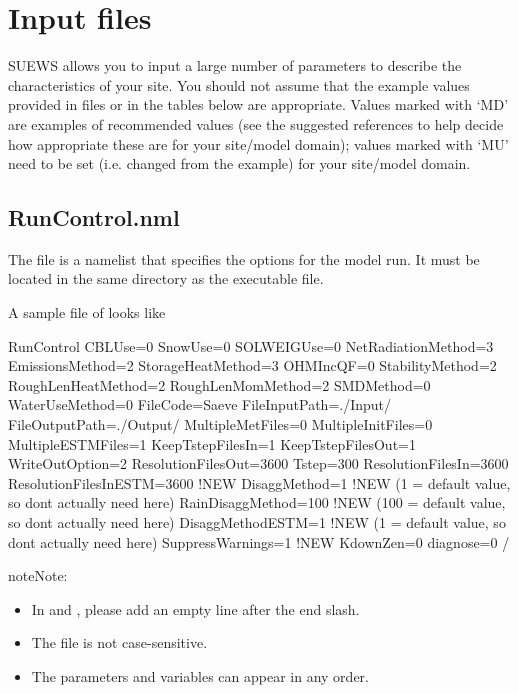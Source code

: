 \documentclass[letterpaper,10pt,english]{sphinxmanual}
\begin{document}
\chapter{Input files}
\label{\detokenize{input_files/input-files::doc}}\label{\detokenize{input_files/input-files:input-files}}
SUEWS allows you to input a large number of parameters to describe the
characteristics of your site. You should not assume that the example
values provided in files or in the tables below are appropriate. Values
marked with ‘MD’ are examples of recommended values (see the suggested
references to help decide how appropriate these are for your site/model
domain); values marked with ‘MU’ need to be set (i.e. changed from the
example) for your site/model domain.


\section{RunControl.nml}
\label{\detokenize{input_files/RunControl/RunControl:runcontrol}}\label{\detokenize{input_files/RunControl/RunControl:runcontrol-nml}}\label{\detokenize{input_files/RunControl/RunControl::doc}}
The file  is a namelist that specifies the options for
the model run. It must be located in the same directory as the
executable file.

A sample file of  looks like

%
\begin{sphinxVerbatim}[commandchars=\\\{\}]
\PYGZam{}RunControl
CBLUse=0
SnowUse=0
SOLWEIGUse=0
NetRadiationMethod=3 
EmissionsMethod=2
StorageHeatMethod=3
OHMIncQF=0
StabilityMethod=2
RoughLenHeatMethod=2
RoughLenMomMethod=2
SMDMethod=0
WaterUseMethod=0
FileCode=\PYGZsq{}Saeve\PYGZsq{}
FileInputPath=\PYGZdq{}./Input/\PYGZdq{}
FileOutputPath=\PYGZdq{}./Output/\PYGZdq{}
MultipleMetFiles=0
MultipleInitFiles=0
MultipleESTMFiles=1
KeepTstepFilesIn=1
KeepTstepFilesOut=1
WriteOutOption=2
ResolutionFilesOut=3600
Tstep=300
ResolutionFilesIn=3600
ResolutionFilesInESTM=3600  !NEW
DisaggMethod=1          !NEW  (1 = default value, so don\PYGZsq{}t actually need here)
RainDisaggMethod=100    !NEW  (100 = default value, so don\PYGZsq{}t actually need here)
DisaggMethodESTM=1      !NEW  (1 = default value, so don\PYGZsq{}t actually need here)
SuppressWarnings=1      !NEW
KdownZen=0
diagnose=0
/
\end{sphinxVerbatim}

\begin{sphinxadmonition}{note}{Note:}\begin{itemize}
\item {} 
In  and , please add an empty line after the end slash.

\item {} 
The file is not case-sensitive.

\item {} 
The parameters and variables can appear in any order.

\end{itemize}
\end{sphinxadmonition}
\end{document}
